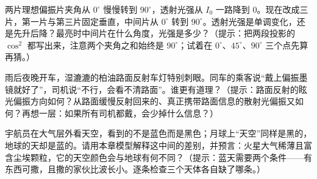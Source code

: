 \begin{puzzles}
\item 两片理想偏振片夹角从 \(0^\circ\) 慢慢转到 \(90^\circ\)，透射光强从 \(I_0\) 一路降到 \(0\)。现在改成三片，第一片与第三片固定垂直，中间片从 \(0^\circ\) 转到 \(90^\circ\)。透射光强是单调变化，还是先升后降？最亮时中间片在什么角度，光强是多少？（提示：把两段投影的 \(\cos^2\) 都写出来，注意两个夹角之和始终是 \(90^\circ\)；试着在 \(0^\circ\)、\(45^\circ\)、\(90^\circ\) 三个点先算再猜。）
\item 雨后夜晚开车，湿漉漉的柏油路面反射车灯特别刺眼。同车的乘客说“戴上偏振墨镜就好了”，司机说“不行，会看不清路面”。谁更有道理？（提示：路面反射的眩光偏振方向如何？从路面缓慢反射回来的、真正携带路面信息的散射光偏振又如何？再想一层：如果所有司机都戴，会少掉什么信息？）
\item 宇航员在大气层外看天空，看到的不是蓝色而是黑色；月球上“天空”同样是黑的，地球的天却是蓝的。请用本章模型解释这中间的差别，并预言：火星大气稀薄且富含尘埃颗粒，它的天空颜色会与地球有何不同？（提示：蓝天需要两个条件——有东西可撒，且撒的家伙比波长小。逐条检查三个天体各自缺了哪条。）
\end{puzzles}
